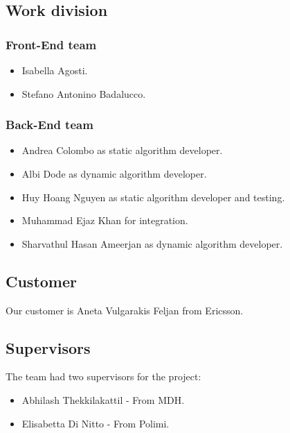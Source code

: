\subsection{Work division}
\subsubsection*{Front-End team}
\begin{itemize}
	\item Isabella Agosti.
	\item Stefano Antonino Badalucco.
\end{itemize}

\subsubsection*{Back-End team}
\begin{itemize}
	\item Andrea Colombo as static algorithm developer.
	\item Albi Dode as dynamic algorithm developer.
	\item Huy Hoang Nguyen as static algorithm developer and testing.
	\item Muhammad Ejaz Khan for integration.
	\item Sharvathul Hasan Ameerjan as dynamic algorithm developer.
\end{itemize}

\subsection{Customer}
Our customer is Aneta Vulgarakis Feljan from Ericsson. 

\subsection{Supervisors}
The team had two supervisors for the project:
\begin{itemize}
	\item Abhilash Thekkilakattil - From MDH.
	\item Elisabetta Di Nitto - From Polimi.
\end{itemize}
\newpage
